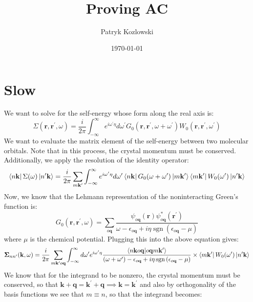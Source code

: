 \documentclass[12pt]{article}
\title{Proving AC}
\author{Patryk Kozlowski}
\date{\today}
\begin{document}
\maketitle
\section{Slow}
We want to solve for the self-energy whose form along the real axis is:
\begin{equation}
\Sigma\left(\mathbf{r}, \mathbf{r}^{\prime}, \omega\right)=\frac{i}{2 \pi} \int_{-\infty}^{\infty} e^{i\omega ^{\prime}\eta }d \omega^{\prime} G_{0}\left(\mathbf{r}, \mathbf{r}^{\prime}, \omega+\omega^{\prime}\right) W_{0}\left(\mathbf{r}, \mathbf{r}^{\prime}, \omega^{\prime}\right)
\end{equation}
We want to evaluate the matrix element of the self-energy between two molecular orbitals. Note that in this process, the crystal momentum must be conserved. Additionally, we apply the resolution of the identity operator:
\begin{equation}
    \bra{n\mathbf{k}} \Sigma (\omega) \ket{n^\prime\mathbf{k}} = \frac{i}{2 \pi} \sum_{m\mathbf{k}^{\prime}} \int_{-\infty}^{\infty} e^{i\omega ^{\prime}\eta }d \omega^{\prime} \bra{n\mathbf{k}} G_0(\omega + \omega^{\prime})\ket{m\mathbf{k}^{\prime}} \bra{m\mathbf{k}^{\prime}}W_0( \omega^{\prime}) \ket{n^\prime\mathbf{k}}
\end{equation}
Now, we know that the Lehmann representation of the noninteracting Green's function is:
\begin{equation}
G_0\left(\mathbf{r}, \mathbf{r}^{\prime}, \omega\right)=\sum_{o \mathbf{q} } \frac{\psi_{o \mathbf{q}}(\mathbf{r}) \psi_{o \mathbf{q}}^{*}\left(\mathbf{r}^{\prime}\right)}{\omega-\epsilon_{o \mathbf{q}}+i \eta \operatorname{sgn}\left(\epsilon_{o \mathbf{q}}-\mu\right)}
\end{equation}
where $\mu$ is the chemical potential. Plugging this into the above equation gives:
\begin{equation}
    \boldsymbol{\Sigma}_{n n^{\prime}}(\mathbf{k}, \omega) = \frac{i}{2 \pi} \sum_{m\mathbf{k}^\prime o\mathbf{q}} \int_{-\infty}^{\infty} d \omega^{\prime} e^{i\omega ^{\prime}\eta }  \frac{\bra{n\mathbf{k}o\mathbf{q}}\ket{o\mathbf{q}m\mathbf{k}^\prime}}{(\omega + \omega^{\prime}) -\epsilon_{o \mathbf{q}} + i \eta \operatorname{sgn}\left(\epsilon_{o \mathbf{q}}-\mu\right)} \times \bra{m\mathbf{k}^\prime}W_0( \omega^{\prime}) \ket{n^\prime\mathbf{k}}
\end{equation}
We know that for the integrand to be nonzero, the crystal momentum must be conserved, so that \(\mathbf{k} + \mathbf{q} = \mathbf{k}^{\prime} + \mathbf{q} \implies \mathbf{k} = \mathbf{k}^{\prime}\) and also by orthogonality of the basis functions we see that \(m\equiv n\), so that the integrand becomes:
\end{document}
